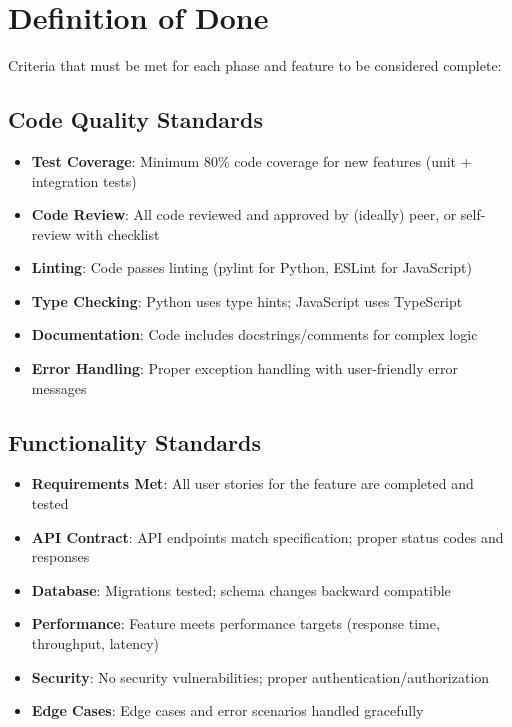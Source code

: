 \documentclass[12pt,oneside]{report}
\begin{document}
\chapter{Definition of Done}

Criteria that must be met for each phase and feature to be considered complete:

\section{Code Quality Standards}

\begin{itemize}
    \item \textbf{Test Coverage}: Minimum 80\% code coverage for new features (unit + integration tests)
    \item \textbf{Code Review}: All code reviewed and approved by (ideally) peer, or self-review with checklist
    \item \textbf{Linting}: Code passes linting (pylint for Python, ESLint for JavaScript)
    \item \textbf{Type Checking}: Python uses type hints; JavaScript uses TypeScript
    \item \textbf{Documentation}: Code includes docstrings/comments for complex logic
    \item \textbf{Error Handling}: Proper exception handling with user-friendly error messages
\end{itemize}

\section{Functionality Standards}

\begin{itemize}
    \item \textbf{Requirements Met}: All user stories for the feature are completed and tested
    \item \textbf{API Contract}: API endpoints match specification; proper status codes and responses
    \item \textbf{Database}: Migrations tested; schema changes backward compatible
    \item \textbf{Performance}: Feature meets performance targets (response time, throughput, latency)
    \item \textbf{Security}: No security vulnerabilities; proper authentication/authorization
    \item \textbf{Edge Cases}: Edge cases and error scenarios handled gracefully
\end{itemize}
\end{document}
